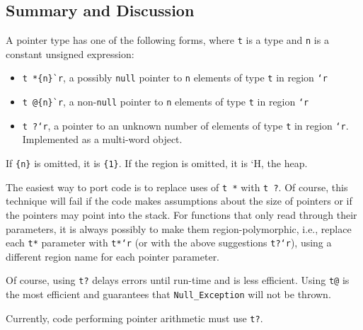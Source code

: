 \subsection*{\hypertarget{pointer_summary}{Summary and Discussion}}
A pointer type has one of the following forms, where \texttt{t} is a
type and \texttt{n} is a constant unsigned expression:

\begin{itemize}
\item \verb|t *{n}`r|, a possibly \texttt{null} pointer to \texttt{n}
  elements of type \texttt{t} in region \texttt{`r}
\item \verb|t @{n}`r|, a non-\texttt{null} pointer to \texttt{n} elements
  of type \texttt{t} in region \texttt{`r}
\item \texttt{t ?`r}, a pointer to an unknown number of elements of type
  \texttt{t} in region \texttt{`r}.  Implemented as a multi-word object.
\end{itemize}
If \verb|{n}| is omitted, it is \verb|{1}|.  If the region is omitted,
it is `H, the heap.

The easiest way to port code is to replace uses of \texttt{t *} with
\texttt{t ?}.  Of course, this technique will fail if the code makes
assumptions about the size of pointers or if the pointers may point
into the stack.  For functions that only read through their
parameters, it is always possibly to make them region-polymorphic,
i.e., replace each \texttt{t*} parameter with \texttt{t*`r} (or with the
above suggestions \texttt{t?`r}), using a different region name for each
pointer parameter.

Of course, using \texttt{t?} delays errors until run-time and is less
efficient.  Using \texttt{t@} is the most efficient and
guarantees that \texttt{Null_Exception} will not be thrown.

Currently, code performing pointer arithmetic must use \texttt{t?}.

